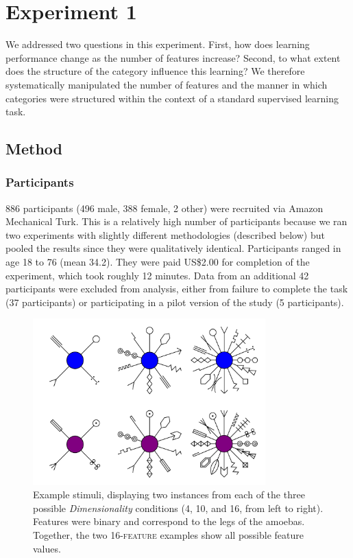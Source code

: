 \documentclass[a4paper, doc, floatsintext]{apa6}
\begin{document}
\section{Experiment 1}

We addressed two questions in this experiment. First, how does learning performance change as the number of features increase? Second, to what extent does the structure of the category influence this learning? We therefore systematically manipulated the number of features and the manner in which categories were structured within the context of a standard supervised learning task.

\subsection{Method}

\subsubsection{Participants}
886 participants (496 male, 388 female, 2 other) were recruited via Amazon Mechanical Turk. This is a relatively high number of participants because we ran two experiments with slightly different methodologies (described below) but pooled the results since they were qualitatively identical. Participants ranged in age 18 to 76 (mean 34.2). They were paid US\$2.00 for completion of the experiment, which took roughly 12 minutes. Data from an additional 42 participants were excluded from analysis, either from failure to complete the task (37 participants) or participating in a pilot version of the study (5 participants).

\begin{figure}[t]
  \begin{center}
    \includegraphics[width=0.8\textwidth]{figures/stimuli.png}
    \caption{\small{Example stimuli, displaying two instances from each of the three possible \textit{Dimensionality} conditions (4, 10, and 16, from left to right). Features were binary and correspond to the legs of the amoebas. Together, the two 16-\textsc{feature} examples show all possible feature values.}}
    \label{experiment-stimuli}
          \vspace{-5mm}
  \end{center}
\end{figure}
\end{document}

